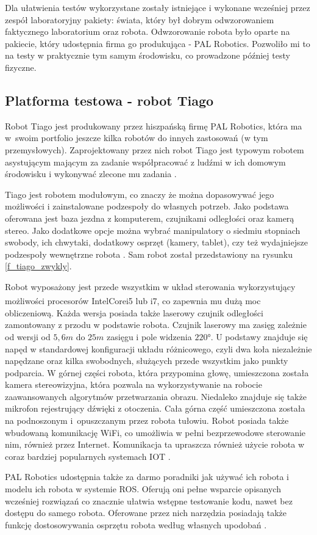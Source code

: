 Dla ułatwienia testów wykorzystane zostały istniejące i wykonane wcześniej przez zespół laboratoryjny pakiety: świata, który był dobrym odwzorowaniem faktycznego laboratorium oraz robota. Odwzorowanie robota było oparte na pakiecie, który udostępnia firma go produkująca - PAL Robotics. Pozwoliło mi to na testy w praktycznie tym samym środowisku, co prowadzone później testy fizyczne.

\subsection{Platforma testowa - robot Tiago}

Robot Tiago jest produkowany przez hiszpańską firmę PAL Robotics, która ma w~swoim portfolio jeszcze kilka robotów do innych zastosowań (w tym przemysłowych). Zaprojektowany przez nich robot Tiago jest typowym robotem asystującym mającym za zadanie współpracować z ludźmi w ich domowym środowisku i wykonywać zlecone mu zadania \cite{b_site_tiago}.

Tiago jest robotem modułowym, co znaczy że można dopasowywać jego możliwości i zainstalowane podzespoły do własnych potrzeb. Jako podstawa oferowana jest baza jezdna z komputerem, czujnikami odległości oraz kamerą stereo. Jako dodatkowe opcje można wybrać manipulatory o siedmiu stopniach swobody, ich chwytaki, dodatkowy osprzęt (kamery, tablet), czy też wydajniejsze podzespoły wewnętrzne robota \cite{b_site_tiago}. Sam robot został przedstawiony na rysunku \ref{f_tiago_zwykly}.

Robot wyposażony jest przede wszystkim w układ sterowania wykorzystujący możliwości procesorów Intel\textsuperscript{\textregistered}Core\texttrademark i5 lub i7, co zapewnia mu dużą moc obliczeniową. Każda wersja posiada także laserowy czujnik odległości zamontowany z przodu w podstawie robota. Czujnik laserowy ma zasięg zależnie od wersji od $5,6m$ do $25m$ zasięgu i pole widzenia $\ang{220}$. U podstawy znajduje się napęd w standardowej konfiguracji układu różnicowego, czyli dwa koła niezależnie napędzane oraz kilka swobodnych, służących przede wszystkim jako punkty podparcia. W górnej części robota, która przypomina głowę, umieszczona została kamera stereowizyjna, która pozwala na wykorzystywanie na robocie zaawansowanych algorytmów przetwarzania obrazu. Niedaleko znajduje się także mikrofon rejestrujący dźwięki z otoczenia. Cała górna część umieszczona została na podnoszonym i~opuszczanym przez robota tułowiu. Robot posiada także wbudowaną komunikację WiFi, co umożliwia w pełni bezprzewodowe sterowanie nim, również przez Internet. Komunikacja ta upraszcza również użycie robota w coraz bardziej popularnych systemach IOT \cite{b_site_tiago}.

PAL Robotics udostępnia także za darmo poradniki jak używać ich robota i modelu ich robota w systemie ROS. Oferują oni pełne wsparcie opisanych wcześniej rozwiązań co znacznie ułatwia wstępne testowanie kodu, nawet bez dostępu do samego robota. Oferowane przez nich narzędzia posiadają także funkcję dostosowywania osprzętu robota według własnych upodobań \cite{b_site_tiago, b_site_tiago_ROS}.
